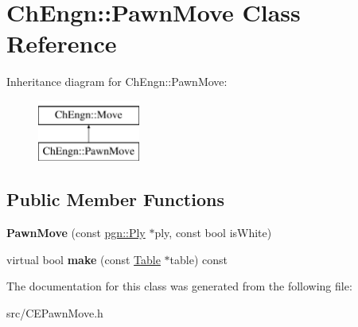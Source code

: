 \hypertarget{classChEngn_1_1PawnMove}{
\section{ChEngn::PawnMove Class Reference}
\label{classChEngn_1_1PawnMove}
}
Inheritance diagram for ChEngn::PawnMove:\begin{figure}[H]
\begin{center}
\leavevmode
\includegraphics[height=2.000000cm]{classChEngn_1_1PawnMove}
\end{center}
\end{figure}
\subsection*{Public Member Functions}
\begin{DoxyCompactItemize}
\item 
\hypertarget{classChEngn_1_1PawnMove_af9c26fd3662874c28d744a030148b670}{
{\bfseries PawnMove} (const \hyperlink{classpgn_1_1Ply}{pgn::Ply} $\ast$ply, const bool isWhite)}
\label{classChEngn_1_1PawnMove_af9c26fd3662874c28d744a030148b670}

\item 
\hypertarget{classChEngn_1_1PawnMove_ab87300c777ded97d1956176469c45415}{
virtual bool {\bfseries make} (const \hyperlink{classChEngn_1_1Table}{Table} $\ast$table) const }
\label{classChEngn_1_1PawnMove_ab87300c777ded97d1956176469c45415}

\end{DoxyCompactItemize}


The documentation for this class was generated from the following file:\begin{DoxyCompactItemize}
\item 
src/CEPawnMove.h\end{DoxyCompactItemize}
